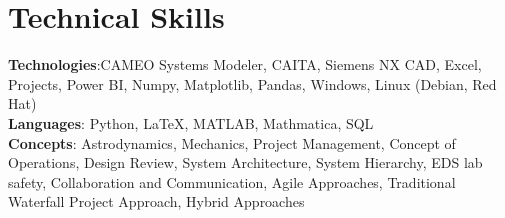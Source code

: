 \section{Technical Skills}
\begin{itemize}[leftmargin=0.15in, label={}]
	\small{\item{
		            \textbf{Technologies}{:CAMEO Systems Modeler, CAITA, Siemens NX CAD, Excel, Projects, Power BI, Numpy, Matplotlib, Pandas, Windows, Linux (Debian, Red Hat)} \\
		            \textbf{Languages}{: Python, LaTeX, MATLAB, Mathmatica, SQL} \\
		            \textbf{Concepts}{: Astrodynamics, Mechanics, Project Management, Concept of Operations, Design Review, System Architecture, System Hierarchy, EDS lab safety, Collaboration and Communication, Agile Approaches, Traditional Waterfall Project Approach, Hybrid Approaches }
		      }}
\end{itemize}
